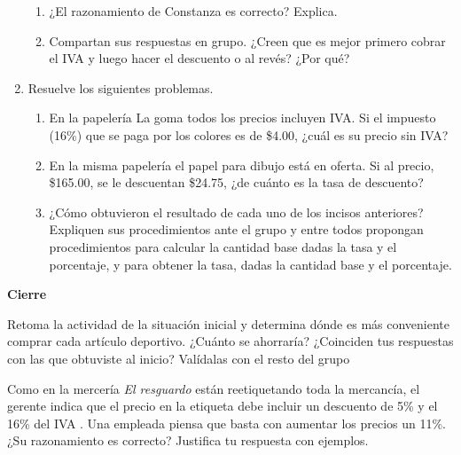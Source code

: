 \begin{enumerate}
\begin{figure}[H]
              \label{fig:sartenes}
          \end{figure}
          \begin{enumerate}
              \item ¿El razonamiento de Constanza es correcto? Explica.
              \item Compartan sus respuestas en grupo. ¿Creen que es mejor primero cobrar el IVA y
                    luego hacer el descuento o al revés? ¿Por qué?
          \end{enumerate}
    \item Resuelve los siguientes problemas.
          \begin{enumerate}
              \item En la papelería La goma todos los precios incluyen IVA. Si el impuesto
                    (16\%) que se paga por los colores es de \$4.00, ¿cuál es su precio sin IVA?
              \item En la misma papelería el papel para dibujo está en oferta. Si al precio,
                    \$165.00, se le descuentan \$24.75, ¿de cuánto es la tasa de descuento?

              \item ¿Cómo obtuvieron el resultado de cada uno de los incisos anteriores? Expliquen
                    sus procedimientos ante el grupo y entre todos propongan procedimientos para
                    calcular la cantidad base dadas la tasa y el porcentaje, y para obtener la tasa,
                    dadas la cantidad base y el porcentaje.
          \end{enumerate}
\end{enumerate}

\begin{boxK}
    \begin{center}\textbf{Cierre}\end{center}

    Retoma la actividad de la situación inicial y determina dónde es más conveniente
    comprar cada artículo deportivo. ¿Cuánto se ahorraría? ¿Coinciden tus
    respuestas con las que obtuviste al inicio? Valídalas con el resto del grupo
\end{boxK}

\begin{boxH}
    Como en la mercería \emph{El resguardo} están reetiquetando toda la mercancía, el gerente
    indica que el precio en la etiqueta debe incluir un descuento de 5\% y el 16\%
    del IVA . Una empleada piensa que basta con aumentar los precios un 11\%. ¿Su razonamiento
    es correcto? Justifica tu respuesta con ejemplos.
\end{boxH}



\newpage